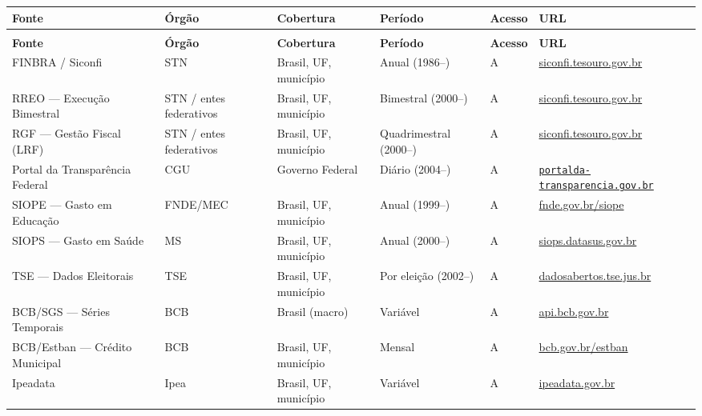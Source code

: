 {\setlength{\tabcolsep}{3pt}\footnotesize\begin{longtable}{@{} >{\raggedright\arraybackslash}p{2.9cm} >{\raggedright\arraybackslash}p{2.3cm} >{\raggedright\arraybackslash}p{2.4cm} >{\raggedright\arraybackslash}p{2.4cm} >{\raggedright\arraybackslash}p{1.1cm} >{\raggedright\arraybackslash}p{3.2cm} @{}}
\toprule
\textbf{Fonte} & \textbf{Órgão} & \textbf{Cobertura} & \textbf{Período} & \textbf{Acesso} & \textbf{URL} \\
\midrule
\endfirsthead
\multicolumn{6}{l}{\small\textit{(continuação)}} \\
\toprule
\textbf{Fonte} & \textbf{Órgão} & \textbf{Cobertura} & \textbf{Período} & \textbf{Acesso} & \textbf{URL} \\
\midrule
\endhead
\bottomrule
\endfoot

FINBRA / Siconfi
  & STN
  & Brasil, UF, município
  & Anual (1986--)
  & A
  & \url{siconfi.tesouro.gov.br} \\

RREO --- Execução Bimestral
  & STN / entes federativos
  & Brasil, UF, município
  & Bimestral (2000--)
  & A
  & \url{siconfi.tesouro.gov.br} \\

RGF --- Gestão Fiscal (LRF)
  & STN / entes federativos
  & Brasil, UF, município
  & Quadrimestral (2000--)
  & A
  & \url{siconfi.tesouro.gov.br} \\

Portal da Transparência Federal
  & CGU
  & Governo Federal
  & Diário (2004--)
  & A
  & \href{https://portaldatransparencia.gov.br}{\nolinkurl{portalda-transparencia.gov.br}} \\

SIOPE --- Gasto em Educação
  & FNDE/MEC
  & Brasil, UF, município
  & Anual (1999--)
  & A
  & \url{fnde.gov.br/siope} \\

SIOPS --- Gasto em Saúde
  & MS
  & Brasil, UF, município
  & Anual (2000--)
  & A
  & \url{siops.datasus.gov.br} \\

TSE --- Dados Eleitorais
  & TSE
  & Brasil, UF, município
  & Por eleição (2002--)
  & A
  & \url{dadosabertos.tse.jus.br} \\

BCB/SGS --- Séries Temporais
  & BCB
  & Brasil (macro)
  & Variável
  & A
  & \url{api.bcb.gov.br} \\

BCB/Estban --- Crédito Municipal
  & BCB
  & Brasil, UF, município
  & Mensal
  & A
  & \url{bcb.gov.br/estban} \\

Ipeadata
  & Ipea
  & Brasil, UF, município
  & Variável
  & A
  & \url{ipeadata.gov.br} \\

\end{longtable}}

